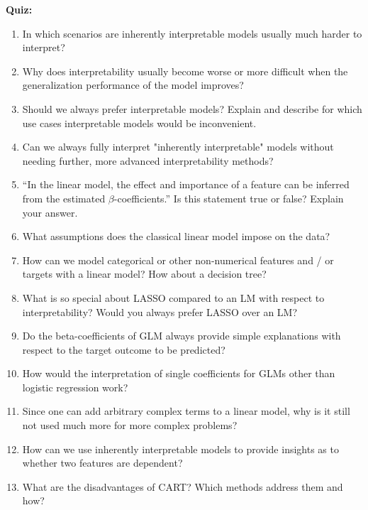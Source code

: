 \textbf{Quiz:}
\begin{enumerate}
   	\item In which scenarios are inherently interpretable models usually much harder to interpret?
   	\item Why does interpretability usually become worse or more difficult when the generalization performance of the model improves?
   	\item Should we always prefer interpretable models? Explain and describe for which use cases interpretable models would be inconvenient.
    \item Can we always fully interpret "inherently interpretable" models without needing further, more advanced interpretability methods?
  	\item ``In the linear model, the effect and importance of a feature can be inferred from the estimated $\beta$-coefficients.'' Is this statement true or false? Explain your answer.
    \item What assumptions does the classical linear model impose on the data?
    \item How can we model categorical or other non-numerical features and / or targets with a linear model? How about a decision tree?
   	\item What is so special about LASSO compared to an LM with respect to interpretability? Would you always prefer LASSO over an LM?
   	\item Do the beta-coefficients of GLM always provide simple explanations with respect to the target outcome to be predicted? 
    \item How would the interpretation of single coefficients for GLMs other than logistic regression work?
  	\item Since one can add arbitrary complex terms to a linear model, why is it still not used much more for more complex problems?
   	\item How can we use inherently interpretable models to provide insights as to whether two features are dependent?
   	\item What are the disadvantages of CART? Which methods address them and how?
\end{enumerate}


    
    